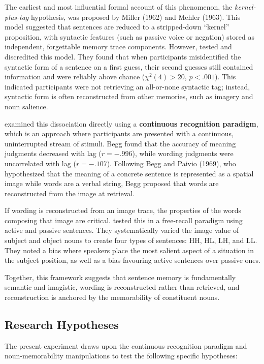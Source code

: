 \documentclass[12pt, a4paper]{article}
\begin{document}
The earliest and most influential formal account of this phenomenon, the \emph{kernel-plus-tag} hypothesis, was proposed by Miller (1962) and Mehler (1963). This model suggested that sentences are reduced to a stripped-down ``kernel'' proposition, with syntactic features (such as passive voice or negation) stored as independent, forgettable memory trace components. However, \citet{bregman1968} tested and discredited this model. They found that when participants misidentified the syntactic form of a sentence on a first guess, their second guesses still contained information and were reliably above chance ($\chi^2(4) > 20$, $p < .001$). This indicated participants were not retrieving an all-or-none syntactic tag; instead, syntactic form is often reconstructed from other memories, such as imagery and noun salience. 

\citet{begg1971} examined this dissociation directly using a \textbf{continuous recognition paradigm}, which is an approach where participants are presented with a continuous, uninterrupted stream of stimuli. Begg found that the accuracy of meaning judgments decreased with lag ($r = -.996$), while wording judgments were uncorrelated with lag ($r = -.107$). Following Begg and Paivio (1969), who hypothesized that the meaning of a concrete sentence is represented as a spatial image while words are a verbal string, Begg proposed that words are reconstructed from the image at retrieval.

If wording is reconstructed from an image trace, the properties of the words composing that image are critical. \citet{james1973} tested this in a free-recall paradigm using active and passive sentences. They systematically varied the image value of subject and object nouns to create four types of sentences: HH, HL, LH, and LL. They noted a bias where speakers place the most salient aspect of a situation in the subject position, as well as a bias favouring active sentences over passive ones.

Together, this framework suggests that sentence memory is fundamentally semantic and imagistic, wording is reconstructed rather than retrieved, and reconstruction is anchored by the memorability of constituent nouns.

\subsection{Research Hypotheses}

The present experiment draws upon the continuous recognition paradigm and noun-memorability manipulations to test the following specific hypotheses:
\end{document}
